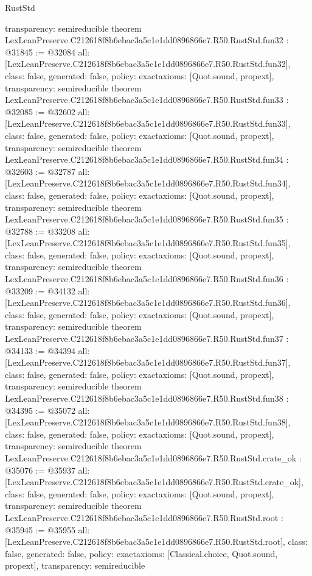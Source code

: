 \begin{lexlean}{RustStd}
\begin{coremodule}
{  transparency: semireducible
}
theorem LexLeanPreserve.C212618f8b6ebac3a5c1e1dd0896866e7.R50.RustStd.fun32 : @31845 := @32084 {
  all: [LexLeanPreserve.C212618f8b6ebac3a5c1e1dd0896866e7.R50.RustStd.fun32],
  class: false,
  generated: false,
  policy: exact{axioms: [Quot.sound, propext]},
  transparency: semireducible
}
theorem LexLeanPreserve.C212618f8b6ebac3a5c1e1dd0896866e7.R50.RustStd.fun33 : @32085 := @32602 {
  all: [LexLeanPreserve.C212618f8b6ebac3a5c1e1dd0896866e7.R50.RustStd.fun33],
  class: false,
  generated: false,
  policy: exact{axioms: [Quot.sound, propext]},
  transparency: semireducible
}
theorem LexLeanPreserve.C212618f8b6ebac3a5c1e1dd0896866e7.R50.RustStd.fun34 : @32603 := @32787 {
  all: [LexLeanPreserve.C212618f8b6ebac3a5c1e1dd0896866e7.R50.RustStd.fun34],
  class: false,
  generated: false,
  policy: exact{axioms: [Quot.sound, propext]},
  transparency: semireducible
}
theorem LexLeanPreserve.C212618f8b6ebac3a5c1e1dd0896866e7.R50.RustStd.fun35 : @32788 := @33208 {
  all: [LexLeanPreserve.C212618f8b6ebac3a5c1e1dd0896866e7.R50.RustStd.fun35],
  class: false,
  generated: false,
  policy: exact{axioms: [Quot.sound, propext]},
  transparency: semireducible
}
theorem LexLeanPreserve.C212618f8b6ebac3a5c1e1dd0896866e7.R50.RustStd.fun36 : @33209 := @34132 {
  all: [LexLeanPreserve.C212618f8b6ebac3a5c1e1dd0896866e7.R50.RustStd.fun36],
  class: false,
  generated: false,
  policy: exact{axioms: [Quot.sound, propext]},
  transparency: semireducible
}
theorem LexLeanPreserve.C212618f8b6ebac3a5c1e1dd0896866e7.R50.RustStd.fun37 : @34133 := @34394 {
  all: [LexLeanPreserve.C212618f8b6ebac3a5c1e1dd0896866e7.R50.RustStd.fun37],
  class: false,
  generated: false,
  policy: exact{axioms: [Quot.sound, propext]},
  transparency: semireducible
}
theorem LexLeanPreserve.C212618f8b6ebac3a5c1e1dd0896866e7.R50.RustStd.fun38 : @34395 := @35072 {
  all: [LexLeanPreserve.C212618f8b6ebac3a5c1e1dd0896866e7.R50.RustStd.fun38],
  class: false,
  generated: false,
  policy: exact{axioms: [Quot.sound, propext]},
  transparency: semireducible
}
theorem LexLeanPreserve.C212618f8b6ebac3a5c1e1dd0896866e7.R50.RustStd.crate_ok : @35076 := @35937 {
  all: [LexLeanPreserve.C212618f8b6ebac3a5c1e1dd0896866e7.R50.RustStd.crate_ok],
  class: false,
  generated: false,
  policy: exact{axioms: [Quot.sound, propext]},
  transparency: semireducible
}
theorem LexLeanPreserve.C212618f8b6ebac3a5c1e1dd0896866e7.R50.RustStd.root : @35945 := @35955 {
  all: [LexLeanPreserve.C212618f8b6ebac3a5c1e1dd0896866e7.R50.RustStd.root],
  class: false,
  generated: false,
  policy: exact{axioms: [Classical.choice, Quot.sound, propext]},
  transparency: semireducible
}


\end{coremodule}
\end{lexlean}
